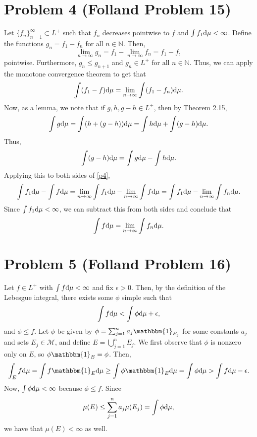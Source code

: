 \documentclass{article}
\begin{document}
\section{Problem 4 (Folland Problem 15)}
Let $\{f_n\}_{n=1}^\infty\subset L^+$ such that $f_n$ decreases pointwise to $f$ and $\int f_1\mathrm{d}\mu<\infty$. Define the functions $g_n=f_1-f_n$ for all $n\in\mathbb{N}$. Then, 
\[
\lim_{n\to\infty}g_n=f_1-\lim_{n\to\infty}f_n=f_1-f,
\]
pointwise. Furthermore, $g_n\leq g_{n+1}$ and $g_n\in L^+$ for all $n\in\mathbb{N}$. Thus, we can apply the monotone convergence theorem to get that
\begin{equation}\label{p4}
\int(f_1-f)\mathrm{d}\mu=\lim_{n\to\infty}\int(f_1-f_n)\mathrm{d}\mu.
\end{equation}
Now, as a lemma, we note that if $g,h,g-h\in L^+$, then by Theorem 2.15,
\[
\int g\mathrm{d}\mu=\int (h+(g-h))\mathrm{d}\mu=\int h\mathrm{d}\mu+\int (g-h)\mathrm{d}\mu.
\]
Thus, 
\[
\int (g-h)\mathrm{d}\mu=\int g\mathrm{d}\mu-\int h\mathrm{d}\mu.
\]
Applying this to both sides of \eqref{p4}, 
\[
\int f_1\mathrm{d}\mu-\int f\mathrm{d}\mu=\lim_{n\to\infty}\int f_1\mathrm{d}\mu-\lim_{n\to\infty}\int f\mathrm{d}\mu=\int f_1\mathrm{d}\mu-\lim_{n\to\infty}\int f_n\mathrm{d}\mu.
\]
Since $\int f_1\mathrm{d}\mu<\infty$, we can subtract this from both sides and conclude that
\[
\int f\mathrm{d}\mu=\lim_{n\to\infty}\int f_n\mathrm{d}\mu.
\]


\section{Problem 5 (Folland Problem 16)}
Let $f\in L^+$ with $\int f\mathrm{d}\mu<\infty$ and fix $\epsilon>0$. Then, by the definition of the Lebesgue integral, there exists some $\phi$ simple such that 
\[
\int f\mathrm{d}\mu<\int\phi\mathrm{d}\mu+\epsilon,
\]
and $\phi\leq f$. Let $\phi$ be given by $\phi=\sum_{j=1}^na_j\mathbbm{1}_{E_j}$ for some constants $a_j$ and sets $E_j\in\mathcal M$, and define $E=\bigcup_{j=1}^n E_j$. We first observe that $\phi$ is nonzero only on $E$, so $\phi\mathbbm{1}_E=\phi$. Then,
\[
\int_Ef\df\mu=\int f\mathbbm{1}_E\df\mu\geq\int \phi\mathbbm{1}_E\df\mu=\int\phi\df\mu>\int f\df\mu-\epsilon.
\]
Now, $\int \phi\mathrm{d}\mu<\infty$ because $\phi\leq f$. Since
\[
\mu(E)\leq\sum_{j=1}^na_j\mu(E_j)=\int \phi\mathrm{d}\mu,
\]
we have that $\mu(E)<\infty$ as well.
\end{document}

